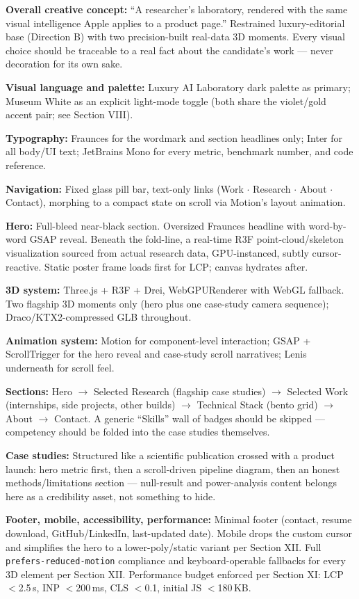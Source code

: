 \documentclass[conference]{IEEEtran}
\begin{document}
\textbf{Overall creative concept:} ``A researcher's laboratory, rendered with the same visual intelligence Apple applies to a product page.'' Restrained luxury-editorial base (Direction B) with two precision-built real-data 3D moments. Every visual choice should be traceable to a real fact about the candidate's work --- never decoration for its own sake.

\textbf{Visual language and palette:} Luxury AI Laboratory dark palette as primary; Museum White as an explicit light-mode toggle (both share the violet/gold accent pair; see Section VIII).

\textbf{Typography:} Fraunces for the wordmark and section headlines only; Inter for all body/UI text; JetBrains Mono for every metric, benchmark number, and code reference.

\textbf{Navigation:} Fixed glass pill bar, text-only links (Work $\cdot$ Research $\cdot$ About $\cdot$ Contact), morphing to a compact state on scroll via Motion's layout animation.

\textbf{Hero:} Full-bleed near-black section. Oversized Fraunces headline with word-by-word GSAP reveal. Beneath the fold-line, a real-time R3F point-cloud/skeleton visualization sourced from actual research data, GPU-instanced, subtly cursor-reactive. Static poster frame loads first for LCP; canvas hydrates after.

\textbf{3D system:} Three.js + R3F + Drei, WebGPURenderer with WebGL fallback. Two flagship 3D moments only (hero plus one case-study camera sequence); Draco/KTX2-compressed GLB throughout.

\textbf{Animation system:} Motion for component-level interaction; GSAP + ScrollTrigger for the hero reveal and case-study scroll narratives; Lenis underneath for scroll feel.

\textbf{Sections:} Hero $\to$ Selected Research (flagship case studies) $\to$ Selected Work (internships, side projects, other builds) $\to$ Technical Stack (bento grid) $\to$ About $\to$ Contact. A generic ``Skills'' wall of badges should be skipped --- competency should be folded into the case studies themselves.

\textbf{Case studies:} Structured like a scientific publication crossed with a product launch: hero metric first, then a scroll-driven pipeline diagram, then an honest methods/limitations section --- null-result and power-analysis content belongs here as a credibility asset, not something to hide.

\textbf{Footer, mobile, accessibility, performance:} Minimal footer (contact, resume download, GitHub/LinkedIn, last-updated date). Mobile drops the custom cursor and simplifies the hero to a lower-poly/static variant per Section XII. Full \texttt{prefers-reduced-motion} compliance and keyboard-operable fallbacks for every 3D element per Section XII. Performance budget enforced per Section XI: LCP $<$2.5\,s, INP $<$200\,ms, CLS $<$0.1, initial JS $<$180\,KB.
\end{document}
